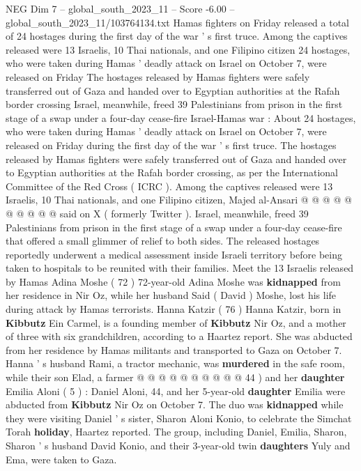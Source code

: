 \begin{textsample}{NEG Dim 7 – global\_south\_2023\_11 – Score -6.00 – global\_south\_2023\_11/103764134.txt}  \label{ex:f7_neg_325}
Hamas fighters on Friday released a total of 24 hostages during the first day of the war ' s first truce.
Among the captives released were 13 Israelis, 10 Thai nationals, and one Filipino citizen 24 hostages, who were taken during Hamas ' deadly attack on Israel on October 7, were released on Friday The hostages released by Hamas fighters were safely transferred out of Gaza and handed over to Egyptian authorities at the Rafah border crossing Israel, meanwhile, freed 39 Palestinians from prison in the first stage of a swap under a four-day cease-fire Israel-Hamas war : About 24 hostages, who were taken during Hamas ' deadly attack on Israel on October 7, were released on Friday during the first day of the war ' s first truce.
The hostages released by Hamas fighters were safely transferred out of Gaza and handed over to Egyptian authorities at the Rafah border crossing, as per the International Committee of the Red Cross ( ICRC ).
Among the captives released were 13 Israelis, 10 Thai nationals, and one Filipino citizen, Majed al-Ansari @ @ @ @ @ @ @ @ @ @ said on X ( formerly Twitter ).
Israel, meanwhile, freed 39 Palestinians from prison in the first stage of a swap under a four-day cease-fire that offered a small glimmer of relief to both sides.
The released hostages reportedly underwent a medical assessment inside Israeli territory before being taken to hospitals to be reunited with their families.
Meet the 13 Israelis released by Hamas Adina Moshe ( 72 ) 72-year-old Adina Moshe was \textbf{kidnapped} from her residence in Nir Oz, while her husband Said ( David ) Moshe, lost his life during attack by Hamas terrorists.
Hanna Katzir ( 76 ) Hanna Katzir, born in \textbf{Kibbutz} Ein Carmel, is a founding member of \textbf{Kibbutz} Nir Oz, and a mother of three with six grandchildren, according to a Haartez report.
She was abducted from her residence by Hamas militants and transported to Gaza on October 7.
Hanna ' s husband Rami, a tractor mechanic, was \textbf{murdered} in the safe room, while their son Elad, a farmer @ @ @ @ @ @ @ @ @ @ 44 ) and her \textbf{daughter} Emilia Aloni ( 5 ) : Daniel Aloni, 44, and her 5-year-old \textbf{daughter} Emilia were abducted from \textbf{Kibbutz} Nir Oz on October 7.
The duo was \textbf{kidnapped} while they were visiting Daniel ' s sister, Sharon Aloni Konio, to celebrate the Simchat Torah \textbf{holiday}, Haartez reported.
The group, including Daniel, Emilia, Sharon, Sharon ' s husband David Konio, and their 3-year-old twin \textbf{daughters} Yuly and Ema, were taken to Gaza.

\end{textsample}

